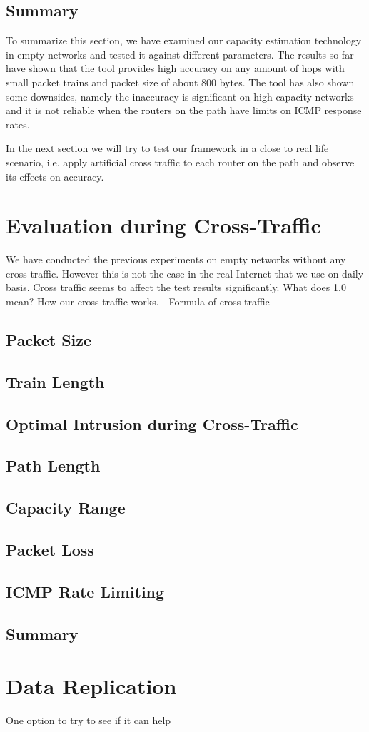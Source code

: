 \subsection{Summary}
To summarize this section, we have examined our capacity estimation technology in empty networks and tested it against different parameters. 
The results so far have shown that the tool provides high accuracy on any amount of hops with small packet trains and packet size of about 800 bytes. 
The tool has also shown some downsides, namely the inaccuracy is significant on high capacity networks and it is not reliable when the routers on the path have limits on ICMP response rates.

In the next section we will try to test our framework in a close to real life scenario, i.e. apply artificial cross traffic to each router on the path and observe its effects on accuracy.


\section{Evaluation during Cross-Traffic}
\label{section_ct}
We have conducted the previous experiments on empty networks without any cross-traffic. However this is not the case in the real Internet that we use on daily basis. 
Cross traffic seems to affect the test results significantly. 
What does 1.0 mean?
How our cross traffic works. - Formula of cross traffic

\subsection{Packet Size}

\subsection{Train Length}

\subsection{Optimal Intrusion during Cross-Traffic}

\subsection{Path Length}

\subsection{Capacity Range}

\subsection{Packet Loss}

\subsection{ICMP Rate Limiting}

\subsection{Summary}


\section{Data Replication}
One option to try to see if it can help
